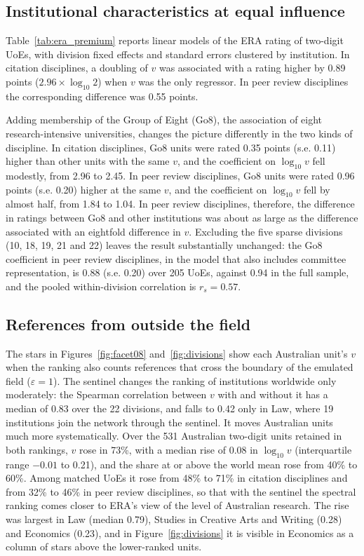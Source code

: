 \subsection{Institutional characteristics at equal influence}

Table~\ref{tab:era_premium} reports linear models of the ERA rating of two-digit UoEs, with division fixed effects and standard errors clustered by institution. In citation disciplines, a doubling of $v$ was associated with a rating higher by 0.89 points ($2.96 \times \log_{10} 2$) when $v$ was the only regressor. In peer review disciplines the corresponding difference was 0.55 points.

Adding membership of the Group of Eight (Go8), the association of eight research-intensive universities, changes the picture differently in the two kinds of discipline. In citation disciplines, Go8 units were rated 0.35 points (s.e. 0.11) higher than other units with the same $v$, and the coefficient on $\log_{10} v$ fell modestly, from 2.96 to 2.45. In peer review disciplines, Go8 units were rated 0.96 points (s.e. 0.20) higher at the same $v$, and the coefficient on $\log_{10} v$ fell by almost half, from 1.84 to 1.04. In peer review disciplines, therefore, the difference in ratings between Go8 and other institutions was about as large as the difference associated with an eightfold difference in $v$. Excluding the five sparse divisions (10, 18, 19, 21 and 22) leaves the result substantially unchanged: the Go8 coefficient in peer review disciplines, in the model that also includes committee representation, is 0.88 (s.e. 0.20) over 205 UoEs, against 0.94 in the full sample, and the pooled within-division correlation is $r_s = 0.57$.



\subsection{References from outside the field}
\label{sec:res_sentinel}

The stars in Figures~\ref{fig:facet08} and~\ref{fig:divisions} show each Australian unit's $v$ when the ranking also counts references that cross the boundary of the emulated field ($\varepsilon = 1$). The sentinel changes the ranking of institutions worldwide only moderately: the Spearman correlation between $v$ with and without it has a median of 0.83 over the 22 divisions, and falls to 0.42 only in Law, where 19 institutions join the network through the sentinel. It moves Australian units much more systematically. Over the 531 Australian two-digit units retained in both rankings, $v$ rose in 73\%, with a median rise of 0.08 in $\log_{10} v$ (interquartile range $-0.01$ to 0.21), and the share at or above the world mean rose from 40\% to 60\%. Among matched UoEs it rose from 48\% to 71\% in citation disciplines and from 32\% to 46\% in peer review disciplines, so that with the sentinel the spectral ranking comes closer to ERA's view of the level of Australian research. The rise was largest in Law (median 0.79), Studies in Creative Arts and Writing (0.28) and Economics (0.23), and in Figure~\ref{fig:divisions} it is visible in Economics as a column of stars above the lower-ranked units.

